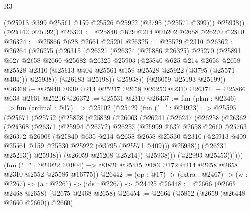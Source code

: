 \begin{lexlean}{R3}
\begin{coremodule}
          (@25913 @399 @25561 @159 @25526 @25922 (@3795 (@25571 @399)))
          @25938))
      (@26142 @25192))
@26321 := @25840 @629 @214 @25202 @2658 @26270 @2310
@26324 := @25866 @628 @2661 @25201
@26325 := @25529 @2310
@26362 := @26264
    (@26275
      (@26315
        (@26321
          (@26324
            (@25886 @26325)
            @26270
            (@25891
              @627
              @2658
              @2660
              @25682
              @26325
              @25903
              (@25840
                @625
                @214
                @2658
                @2658
                @25528
                @2310
                (@25913 @404 @25561 @159 @25528 @25922 (@3795 (@25571 @404)))
                @25938))
            (@26183 @25198))
          @25938))
      (@26059 @25193 @25199))
@26368 := @25840 @639 @214 @25217 @2658 @26253 @2310
@26371 := @25866 @638 @2661 @25216
@26372 := @25531 @2310
@26437 := fun (plan : @2346) =>
  fun (ordinal : @17) =>
  @25102
    (@25429
      (fun ("_" : @24923) =>
      @25595
        (@25671
          (@25752
            (@25828
              (@25839
                (@26063
                  (@26241
                    (@26247
                      (@26258
                        (@26362
                          (@26368
                            (@26371
                              (@25994 @26372)
                              @26253
                              (@25999
                                @637
                                @2658
                                @2660
                                @25763
                                @26372
                                @26009
                                (@25840
                                  @635
                                  @214
                                  @2658
                                  @2658
                                  @25530
                                  @2310
                                  (@25913 @409 @25561 @159 @25530 @25922 (@3795 (@25571 @409)))
                                  @25938))
                              (@26231 @25213))
                            @25938))
                        (@26059 @25208 @25214))
                      @25938)))
                (@22993 @25453))))))
      (fun ("_" : @24922 @3904) =>
      @3826 @25435 @183 @172 @214 @2658 @2658 @2310 @2552 @25586 @16775))
@26442 := (op : @17) -> (extra : @2467) -> (w : @2267) -> (a : @2267) -> (ids : @2267) -> @24425
@26448 := @2666 (@2668 @2468 @2658) (@2675 @2468 @2658)
@26454 := @2664 (@5852 (@2659 (@26448 @2660 @2660)) @2660)

\end{coremodule}
\end{lexlean}
